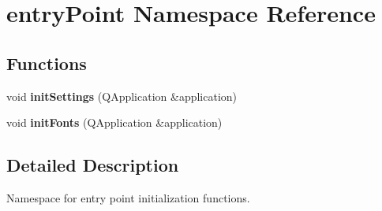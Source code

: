 \hypertarget{namespaceentry_point}{}\section{entry\+Point Namespace Reference}
\label{namespaceentry_point}
\subsection*{Functions}
\begin{DoxyCompactItemize}
\item 
\hypertarget{namespaceentry_point_ad344ac9d0479fe78fc480497d3f67eb9}{}void {\bfseries init\+Settings} (Q\+Application \&application)\label{namespaceentry_point_ad344ac9d0479fe78fc480497d3f67eb9}

\item 
\hypertarget{namespaceentry_point_a49b9cfe82a78453a1c7a12d8aecde198}{}void {\bfseries init\+Fonts} (Q\+Application \&application)\label{namespaceentry_point_a49b9cfe82a78453a1c7a12d8aecde198}

\end{DoxyCompactItemize}


\subsection{Detailed Description}
Namespace for entry point initialization functions. 